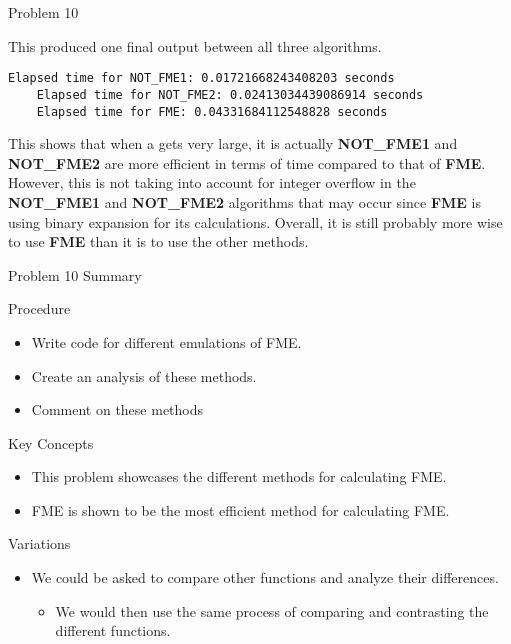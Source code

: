 \begin{problem}{Problem 10}
\begin{highlight}[Solution]
        This produced one final output between all three algorithms.
    \begin{lstlisting}[style=stackoverflow]
    Elapsed time for NOT_FME1: 0.01721668243408203 seconds
    Elapsed time for NOT_FME2: 0.02413034439086914 seconds
    Elapsed time for FME: 0.04331684112548828 seconds
    \end{lstlisting}

        This shows that when a gets very large, it is actually \textbf{NOT\_FME1} and \textbf{NOT\_FME2} are more efficient in terms of time compared to that of \textbf{FME}. However, this is not taking into
        account for integer overflow in the \textbf{NOT\_FME1} and \textbf{NOT\_FME2} algorithms that may occur since \textbf{FME} is using binary expansion for its calculations. Overall, it is still
        probably more wise to use \textbf{FME} than it is to use the other methods.
    \end{highlight}
\end{problem}

\begin{summary}{Problem 10 Summary}
    \begin{statement}{Procedure}
        \begin{itemize}
            \item Write code for different emulations of FME.
            \item Create an analysis of these methods.
            \item Comment on these methods
        \end{itemize}
    \end{statement}
    \begin{statement}{Key Concepts}
        \begin{itemize}
            \item This problem showcases the different methods for calculating FME.
            \item FME is shown to be the most efficient method for calculating FME.
        \end{itemize}
    \end{statement}
    \begin{statement}{Variations}
        \begin{itemize}
            \item We could be asked to compare other functions and analyze their differences.
            \begin{itemize}
                \item We would then use the same process of comparing and contrasting the different functions.
            \end{itemize}
        \end{itemize}
    \end{statement}
\end{summary}